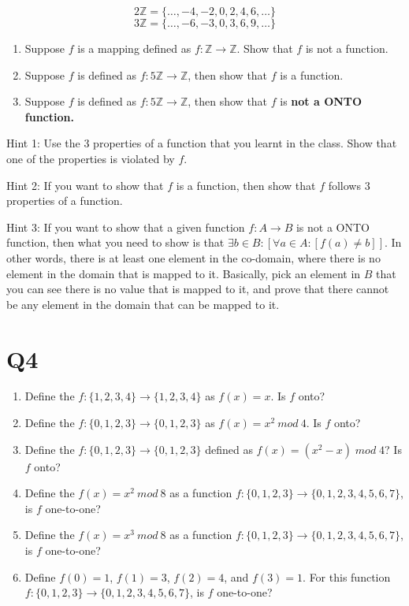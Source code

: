 \documentclass[12pt]{exam}
\begin{document}
\[2\mathds{Z} = \{\ldots, -4, -2, 0, 2, 4, 6, \ldots\}\]
\[3\mathds{Z} = \{\ldots, -6, -3, 0, 3, 6, 9, \ldots\}\]

\begin{enumerate}
    \item Suppose $f$ is a mapping defined as $f : \mathds{Z} \rightarrow \mathds{Z}$. Show that $f$ is not a function.
    \item Suppose $f$ is defined as $f: 5\mathds{Z} \rightarrow \mathds{Z}$, then show that $f$ is a function.
    \item Suppose $f$ is defined as $f: 5\mathds{Z} \rightarrow \mathds{Z}$, then show that $f$ is \textbf{not a ONTO function.}
\end{enumerate}

Hint 1: Use the $3$ properties of a function that you learnt in the class. Show that one of the properties is violated by $f$.

Hint 2: If you want to show that $f$ is a function, then show that $f$ follows $3$ properties of a function.

Hint 3: If you want to show that a given function $f: A \rightarrow B$ is not a ONTO function, then what you need to show is that $\exists b \in B: [\forall a \in A: [f(a) \neq b]]$. In other words, there is at least one element in the co-domain, where there is no element in the domain that is mapped to it. Basically, pick an element in $B$ that you can see there is no value that is mapped to it, and prove that there cannot be any element in the domain that can be mapped to it.

\section{Q4}
\begin{enumerate}
    \item Define the $f : \{1, 2, 3, 4\} \rightarrow \{1, 2, 3, 4\}$ as $f(x) = x$. Is $f$ onto?
    \item Define the $f : \{0, 1, 2, 3\} \rightarrow \{0, 1, 2, 3\}$ as $f(x) = x^2~mod~4$. Is $f$ onto?
    \item Define the $f : \{0, 1, 2, 3\} \rightarrow \{0, 1, 2, 3\}$ defined as $f(x) = (x^2 - x)\;mod\;4$? Is $f$ onto?
    \item Define the $f(x) = x^2~mod~8$ as a function $f : \{0, 1, 2, 3\} \rightarrow \{0, 1, 2, 3 , 4 , 5 , 6 , 7\}$, is $f$ one-to-one?
    \item Define the $f(x) = x^3~mod~8$ as a function $f : \{0, 1, 2, 3\} \rightarrow \{0, 1, 2, 3,4, 5, 6, 7\}$, is $f$ one-to-one?
    \item Define $f(0) = 1$, $f(1) = 3$, $f(2) = 4$, and $f(3) = 1$. For this function $f : \{0, 1, 2, 3\} \rightarrow \{0, 1,2, 3, 4, 5, 6, 7\}$, is $f$ one-to-one?
\end{enumerate}
\end{document}
